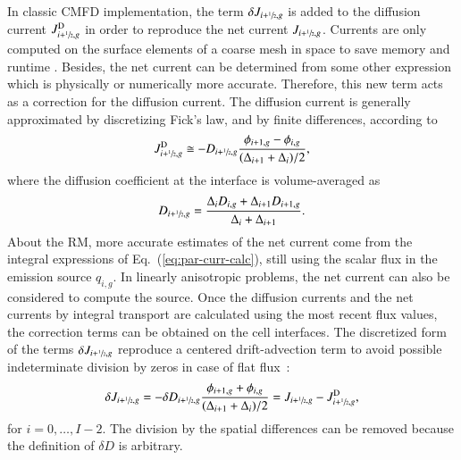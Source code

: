 \documentclass[review,3p,onecolumn,sort&compress]{elsarticle}
\newcommand{\eq}[1]{Eq.~(\ref{#1})}
\newcommand{\jD}{\ensuremath{J^{\textrm{\scriptsize{D}}}}}
\newcommand{\hzi}{\ensuremath{\sfrac{1}{2}}}
\begin{document}
In classic CMFD implementation, the term $\delta J_{i+\hzi,g}$ is added to the diffusion current $\jD_{i+\hzi,g}$ in order to reproduce the net current $J_{i+\hzi,g}$. Currents are only computed on the surface elements of a coarse mesh in space to save memory and runtime \cite{Smith-1983}. Besides, the net current can be determined from some other expression which is physically or numerically more accurate. Therefore, this new term acts as a correction for the diffusion current. The diffusion current is generally approximated by discretizing Fick's law, and by finite differences, according to 
\begin{equation}
\label{eq:JD}
\jD_{i+\hzi,g} \cong - D_{i+\hzi,g}
\frac{\phi_{i+1,g} - \phi_{i,g}}{(\Delta_{i+1} + \Delta_i)/2},
\end{equation}
where the diffusion coefficient at the interface is volume-averaged as
\begin{equation}
\label{eq:Ds}
D_{i+\hzi,g} = \frac{\Delta_i D_{i,g} + \Delta_{i+1} D_{i+1,g}}
{\Delta_i + \Delta_{i+1}}.
\end{equation}
%
About the RM, more accurate estimates of the net current come from the integral expressions of \eq{eq:par-curr-calc}, still using the scalar flux in the emission source $q_{i,g}$. In linearly anisotropic problems, the net current can also be considered to compute the source. Once the diffusion currents and the net currents by integral transport are calculated using the most recent flux values, the correction terms can be obtained on the cell interfaces. The discretized form of the terms $\delta J_{i+\hzi,g}$ reproduce a centered drift-advection term to avoid possible indeterminate division by zeros in case of flat flux~\cite{Smith-1983,Tomatis-2011}:
\begin{equation}
\label{eq:dJ}
\delta J_{i+\hzi,g} = -\delta D_{i+\hzi,g}
\frac{\phi_{i+1,g} + \phi_{i,g}}{(\Delta_{i+1} + \Delta_i)/2} =
J_{i+\hzi,g} - \jD_{i+\hzi,g},
\end{equation}
for $i = 0, \ldots, I-2$. The division by the spatial differences can be removed because the definition of $\delta D$ is arbitrary.
\end{document}
